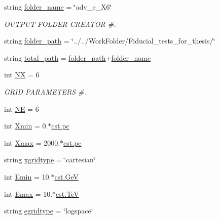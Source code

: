 \begin{DoxyCompactItemize}
\item 
string \hyperlink{namespacenamelist__adve_a57db1b9f7ed5af1ca8879a98193fd7dd}{folder\+\_\+name} = \char`\"{}adv\+\_\+e\+\_\+\+X6\char`\"{}
\begin{DoxyCompactList}\small\item\em O\+U\+T\+P\+UT F\+O\+L\+D\+ER C\+R\+E\+A\+T\+OR \#. \end{DoxyCompactList}\item 
string \hyperlink{namespacenamelist__adve_af594fa1c116bd203cc6912a56193c7a4}{folder\+\_\+path} = \char`\"{}../../Work\+Folder/Fiducial\+\_\+tests\+\_\+for\+\_\+thesis/\char`\"{}
\item 
string \hyperlink{namespacenamelist__adve_a1b6a8f38fb67d24f91182c68dec35aa5}{total\+\_\+path} = \hyperlink{namespacenamelist__adve_af594fa1c116bd203cc6912a56193c7a4}{folder\+\_\+path}+\hyperlink{namespacenamelist__adve_a57db1b9f7ed5af1ca8879a98193fd7dd}{folder\+\_\+name}
\item 
int \hyperlink{namespacenamelist__adve_a69821b0319f4a74f532ba8cff775efd1}{NX} = 6
\begin{DoxyCompactList}\small\item\em G\+R\+ID P\+A\+R\+A\+M\+E\+T\+E\+RS \#. \end{DoxyCompactList}\item 
int \hyperlink{namespacenamelist__adve_a988e38118f1948c66060053e0535ebf7}{NE} = 6
\item 
int \hyperlink{namespacenamelist__adve_a4c1840cec878f104fe26d7975343fe76}{Xmin} = 0.$\ast$\hyperlink{constants_8h_a2884cd030c4c825754349a525a1d06ce}{cst.\+pc}
\item 
int \hyperlink{namespacenamelist__adve_a72dd501f8f17b05467f30b55d0507e79}{Xmax} = 2000.$\ast$\hyperlink{constants_8h_a2884cd030c4c825754349a525a1d06ce}{cst.\+pc}
\item 
string \hyperlink{namespacenamelist__adve_a79b0e2e3e65253b723ea468d60d096ae}{xgridtype} = \char`\"{}cartesian\char`\"{}
\item 
int \hyperlink{namespacenamelist__adve_a1792088e08a85cd9d2b3edb7928e2a2f}{Emin} = 10.$\ast$\hyperlink{constants_8h_aec0e126d9991db8ad0b26139f5860568}{cst.\+GeV}
\item 
int \hyperlink{namespacenamelist__adve_a4b0109a1cb1ad1d638849ef7fc9c3839}{Emax} = 10.$\ast$\hyperlink{constants_8h_a7f801e1f6821bc6baf0652ed2496e5e9}{cst.\+TeV}
\item 
string \hyperlink{namespacenamelist__adve_a1660ec5595b36528dcc6f4062dffe3cd}{egridtype} = \char`\"{}logspace\char`\"{}

\end{DoxyCompactItemize}
